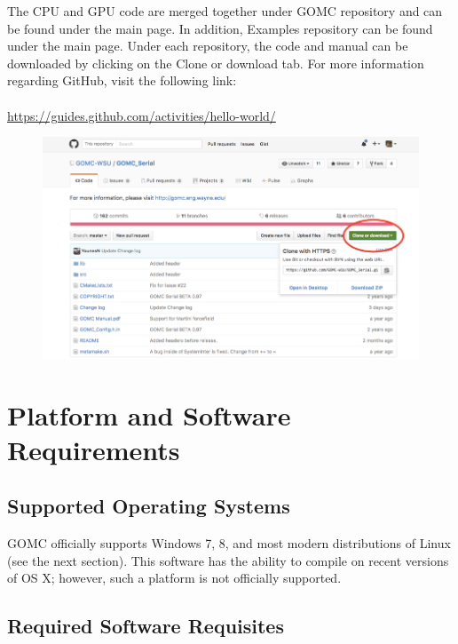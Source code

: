 The CPU and GPU code are merged together under GOMC repository and can be found under the main page. In addition, Examples repository can be found under the main page. Under each repository, the code and manual can be downloaded by clicking on the Clone or download tab. For more information regarding GitHub, visit the following link:\\\\
\url{https://guides.github.com/activities/hello-world/}

\begin{figure}[H]
\centering
\includegraphics[scale=0.8]{images/clone}
\end{figure}

\section{Platform and Software Requirements}

\subsection{Supported Operating Systems}

GOMC officially supports Windows 7, 8, and most modern distributions of Linux (see the next section).  This software has the ability to compile on recent versions of OS X; however, such a platform is not officially supported. 

\subsection{Required Software Requisites}

